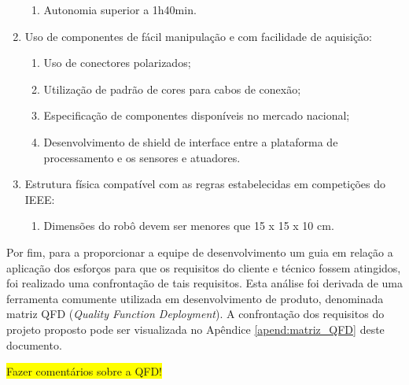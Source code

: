 \begin{enumerate}
\begin{enumerate}
		\item Autonomia superior a 1h40min.
	\end{enumerate}
	
	\item Uso de componentes de fácil manipulação e com facilidade de aquisição:
	\begin{enumerate}
		\item Uso de conectores polarizados;
		
		\item Utilização de padrão de cores para cabos de conexão;
		
		\item Especificação de componentes disponíveis no mercado nacional;
		
		\item Desenvolvimento de shield de interface entre a plataforma de processamento e os sensores e atuadores.
	\end{enumerate}
	
	\item Estrutura física compatível com as regras estabelecidas em competições do IEEE:
	\begin{enumerate}
		\item Dimensões do robô devem ser menores que 15 x 15 x 10 cm.
	\end{enumerate}
\end{enumerate}

Por fim, para a proporcionar a equipe de desenvolvimento um guia em relação a aplicação dos esforços para que os requisitos do cliente e técnico fossem atingidos, foi realizado uma confrontação de tais requisitos. Esta análise foi derivada de uma ferramenta comumente utilizada em desenvolvimento de produto, denominada matriz QFD (\textit{Quality Function Deployment}). A confrontação dos requisitos do projeto proposto pode ser visualizada no Apêndice \ref{apend:matriz_QFD} deste documento.

\colorbox{yellow}{Fazer comentários sobre a QFD!}


